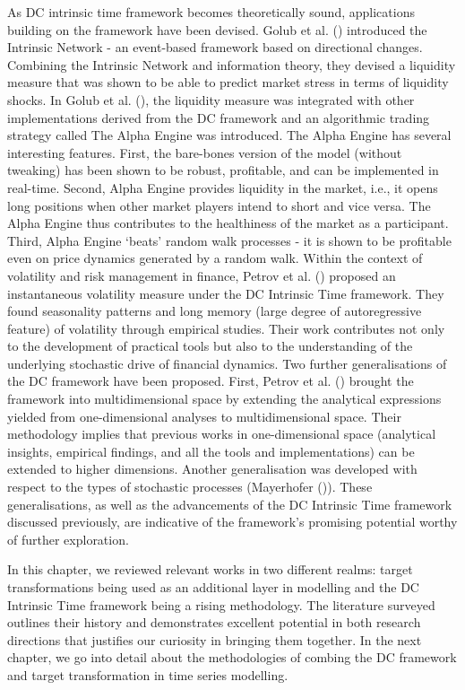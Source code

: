 As DC intrinsic time framework becomes theoretically sound, applications building on the framework have been devised. Golub et al. (\citeyear{golub2016multi}) introduced the Intrinsic Network - an event-based framework based on directional changes. Combining the Intrinsic Network and information theory, they devised a liquidity measure that was shown to be able to predict market stress in terms of liquidity shocks. In Golub et al. (\citeyear{golub2018alpha}), the liquidity measure was integrated with other implementations derived from the DC framework and an algorithmic trading strategy called The Alpha Engine was introduced. The Alpha Engine has several interesting features. First, the bare-bones version of the model (without tweaking) has been shown to be robust, profitable, and can be implemented in real-time. Second, Alpha Engine provides liquidity in the market, i.e., it opens long positions when other market players intend to short and vice versa. The Alpha Engine thus contributes to the healthiness of the market as a participant. Third, Alpha Engine `beats' random walk processes - it is shown to be profitable even on price dynamics generated by a random walk. Within the context of volatility and risk management in finance, Petrov et al. (\citeyear{petrov2019instantaneous}) proposed an instantaneous volatility measure under the DC Intrinsic Time framework. They found seasonality patterns and long memory (large degree of autoregressive feature) of volatility through empirical studies. Their work contributes not only to the development of practical tools but also to the understanding of the underlying stochastic drive of financial dynamics. Two further generalisations of the DC framework have been proposed. First, Petrov et al. (\citeyear{petrov2019intrinsic}) brought the framework into multidimensional space by extending the analytical expressions yielded from one-dimensional analyses to multidimensional space. Their methodology implies that previous works in one-dimensional space (analytical insights, empirical findings, and all the tools and implementations) can be extended to higher dimensions. Another generalisation was developed with respect to the types of stochastic processes (Mayerhofer (\citeyear{mayerhofer2019three})). These generalisations, as well as the advancements of the DC Intrinsic Time framework discussed previously, are indicative of the framework's promising potential worthy of further exploration.

In this chapter, we reviewed relevant works in two different realms: target transformations being used as an additional layer in modelling and the DC Intrinsic Time framework being a rising methodology. The literature surveyed outlines their history and demonstrates excellent potential in both research directions that justifies our curiosity in bringing them together. In the next chapter, we go into detail about the methodologies of combing the DC framework and target transformation in time series modelling.
